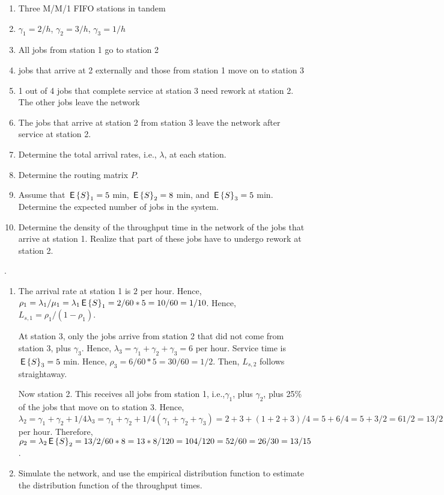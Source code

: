 \begin{question}[use=false]
  \begin{enumerate}
  \item Three M/M/1 FIFO stations in tandem
  \item $\gamma_1 = 2/h$,  $\gamma_2 = 3/h$, $\gamma_3 = 1/h$
  \item All jobs from station 1 go to station 2
  \item jobs that arrive at 2 externally and those from station 1 move
    on to station 3
  \item 1 out of 4 jobs that complete service at station 3 need rework
    at station 2. The other  jobs leave the network
  \item The jobs that arrive at station 2 from station 3 leave the
    network after service at station 2.
  \item Determine the total arrival rates, i.e., $\lambda$, at each
    station. 
  \item Determine the routing matrix $P$. 
  \item Assume that $\,\mathsf{E}\left\{S\right\}_1 = 5$ min, $\,\mathsf{E}\left\{S\right\}_2 = 8$ min, and $\,\mathsf{E}\left\{S\right\}_3 =
    5$ min. Determine the expected number of jobs in the system. 
  \item Determine the density of the throughput time in the network
    of the jobs that arrive at station 1. Realize that part of these
    jobs have to undergo rework at station 2.
  \end{enumerate}
\begin{solution}
\TBD.
  \begin{enumerate}
  \item 
  The arrival rate at station 1 is $2$ per hour. Hence, $\rho_1 =
  \lambda_1/\mu_1 = \lambda_1 \,\mathsf{E}\left\{S\right\}_1 = 2/60 * 5 = 10/60 =
  1/10$. Hence, $L_{s,1} = \rho_1/(1-\rho_1)$.

  At station 3, only the jobs arrive from station 2 that did not come
  from station 3, plus $\gamma_3$. Hence, $\lambda_3 = \gamma_1 +
  \gamma_2 + \gamma_3 = 6$ per hour. Service time is $\,\mathsf{E}\left\{S\right\}_3 = 5$
  min. Hence, $\rho_3 = 6/60 * 5 = 30/60 = 1/2$. Then, $L_{s,2}$
  follows straightaway.

  Now station 2. This receives all jobs from station 1,
  i.e.,$\gamma_1$, plus $\gamma_2$, plus 25\% of the jobs that move on
  to station 3. Hence, $\lambda_2 = \gamma_1 + \gamma_2 + 1/4
  \lambda_3 = \gamma_1 + \gamma_2 + 1/4(\gamma_1 + \gamma_2 +
  \gamma_3) = 2 + 3 + (1+2+3)/4 = 5+6/4 = 5 + 3/2 = 6 1/2 = 13/2$ per
  hour. Therefore, $\rho_2 = \lambda_2 \,\mathsf{E}\left\{S\right\}_2 = 13/2/60 * 8 = 13*8/120
  = 104/120 = 52/60 = 26/30 = 13/15$.
\item   Simulate the network, and use the empirical distribution function to
  estimate the distribution function of the throughput times.
  \end{enumerate}
\end{solution}
\end{question}




